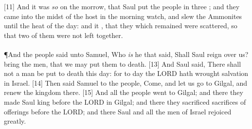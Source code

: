 [11] \textcolor[cmyk]{0.99998,1,0,0}{And it was \emph{so} on the morrow, that Saul put the people in three ; and they came into the midst of the host in the morning watch, and slew the Ammonites until the heat of the day: and it , that they which remained were scattered, so that two of them were not left together.}\\
\\
\P \textcolor[cmyk]{0.99998,1,0,0}{And the people said unto Samuel, Who \emph{is} he that said, Shall Saul reign over us? bring the men, that we may put them to death.}
[13] \textcolor[cmyk]{0.99998,1,0,0}{And Saul said, There shall not a man be put to death this day: for to day the LORD hath wrought salvation in Israel.}
[14] \textcolor[cmyk]{0.99998,1,0,0}{Then said Samuel to the people, Come, and let us go to Gilgal, and renew the kingdom there.}
[15] \textcolor[cmyk]{0.99998,1,0,0}{And all the people went to Gilgal; and there they made Saul king before the LORD in Gilgal; and there they sacrificed sacrifices of  offerings before the LORD; and there Saul and all the men of Israel rejoiced greatly.}